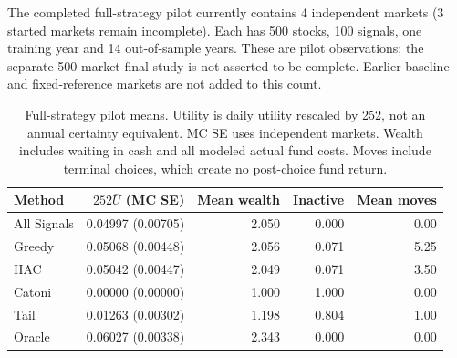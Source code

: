 The completed full-strategy pilot currently contains 4 independent markets (3 started markets remain incomplete). Each has 500 stocks, 100 signals, one training year and 14 out-of-sample years. These are pilot observations; the separate 500-market final study is not asserted to be complete. Earlier baseline and fixed-reference markets are not added to this count.

\begin{table}[H]\centering\small

\begin{tabular}{lrrrr}

\toprule

Method & $252\bar U$ (MC SE) & Mean wealth & Inactive & Mean moves \\

\midrule

All Signals & 0.04997 (0.00705) & 2.050 & 0.000 & 0.00 \\

Greedy & 0.05068 (0.00448) & 2.056 & 0.071 & 5.25 \\

HAC & 0.05042 (0.00447) & 2.049 & 0.071 & 3.50 \\

Catoni & 0.00000 (0.00000) & 1.000 & 1.000 & 0.00 \\

Tail & 0.01263 (0.00302) & 1.198 & 0.804 & 1.00 \\

Oracle & 0.06027 (0.00338) & 2.343 & 0.000 & 0.00 \\

\bottomrule\end{tabular}

\caption{Full-strategy pilot means. Utility is daily utility rescaled by 252, not an annual certainty equivalent. MC SE uses independent markets. Wealth includes waiting in cash and all modeled actual fund costs. Moves include terminal choices, which create no post-choice fund return.}\end{table}

